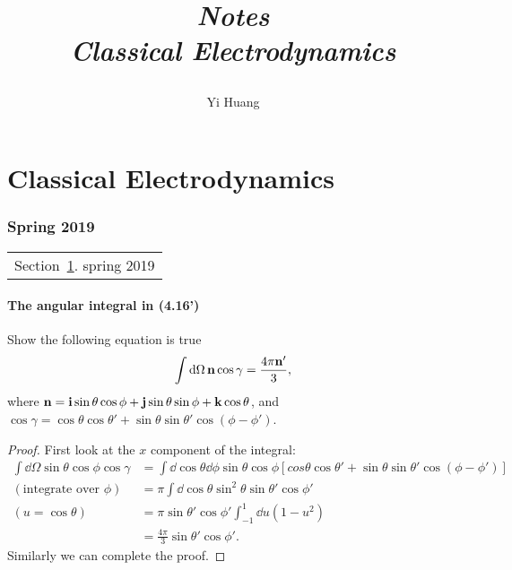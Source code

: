 \documentclass[10pt]{article}
\title{\begin{center}{\Huge \textit{Notes}}\\{{\itshape Classical Electrodynamics}}\end{center}}
\author{Yi Huang}
\affiliation{
University of Minnesota
}
\begin{document}
	\maketitle
	\flushbottom
	\newpage
	\pagestyle{fancynotes}
	\part{Classical Electrodynamics}
	\section{Spring 2019}\label{sec:spring2019}
	\begin{margintable}\vspace{.8in}\footnotesize
		\begin{tabularx}{\marginparwidth}{|X}
		Section~\ref{sec:spring2019}. spring 2019\\
		\end{tabularx}
	\end{margintable}

\subsection{The angular integral in (4.16')}

Show the following equation is true
\begin{equation}
	\int \dd{\Omega} \vb{n} \cos{\gamma} = \frac{4 \pi \vb{n}'}{3},
\end{equation}
where $\vb{n} = \vb{i} \sin{\theta} \cos{\phi} + \vb{j} \sin{\theta} \sin{\phi} + \vb{k} \cos{\theta}$, and $\cos{\gamma} = \cos{\theta} \cos{\theta'} + \sin{\theta} \sin{\theta'} \cos(\phi - \phi')$.
\begin{proof}
	First look at the $x$ component of the integral:
	\begin{align*}
		\int \dd{\Omega} \sin{\theta} \cos{\phi} \cos{\gamma} &= \int \dd{\cos{\theta}} \dd{\phi} \sin{\theta} \cos{\phi} [cos{\theta} \cos{\theta'} + \sin{\theta} \sin{\theta'} \cos(\phi - \phi')] \\
		(\text{integrate over $\phi$}) &= \pi \int \dd{\cos{\theta}} \sin^2{\theta} \sin{\theta'} \cos{\phi'} \\
		(u = \cos{\theta}) &= \pi \sin{\theta'} \cos{\phi'} \int_{-1}^{1} \dd{u} (1-u^2) \\
		&= \frac{4\pi}{3} \sin{\theta'} \cos{\phi'}.
	\end{align*}
	Similarly we can complete the proof.
\end{proof}
\end{document}
